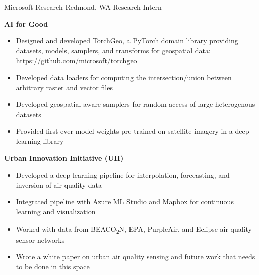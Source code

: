 
        {Microsoft Research}
        {Redmond, WA}
        {Research Intern}
        {}{
    \textbf{AI for Good}
    \begin{itemize}
        \item Designed and developed TorchGeo, a PyTorch domain library providing datasets, models, samplers, and transforms for geospatial data: \url{https://github.com/microsoft/torchgeo}
        \item Developed data loaders for computing the intersection/union between arbitrary raster and vector files
        \item Developed geospatial-aware samplers for random access of large heterogenous datasets
        \item Provided first ever model weights pre-trained on satellite imagery in a deep learning library
    \end{itemize}
    \textbf{Urban Innovation Initiative (UII)}
    \begin{itemize}
        \item Developed a deep learning pipeline for interpolation, forecasting, and inversion of air quality data
        \item Integrated pipeline with Azure ML Studio and Mapbox for continuous learning and visualization
        \item Worked with data from BEACO\textsubscript{2}N, EPA, PurpleAir, and Eclipse air quality sensor networks
        \item Wrote a white paper on urban air quality sensing and future work that needs to be done in this space
    \end{itemize}
}
